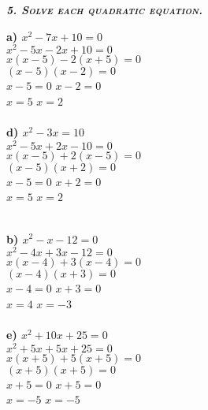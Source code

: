 \documentclass{article}
\begin{document}
\textbf{\emph{\textsc{5. Solve each quadratic equation.}}}
\begin{multicols}{3}
    \textbf{a) $x^2-7x+10=0$} \\
    $x^2-5x-2x+10=0$ \\
    $x(x-5)-2(x+5)=0$ \\
    $(x-5)(x-2)=0$ \\
    $x-5=0$ \hspace{0.45cm} $x-2=0$ \\
    $x=5$ \hspace{1cm} $x=2$ \\ \\
    \textbf{d) $x^2-3x=10$} \\
    $x^2-5x+2x-10=0$ \\
    $x(x-5)+2(x-5)=0$ \\
    $(x-5)(x+2)=0$ \\
    $x-5=0$ \hspace{0.45cm}  $x+2=0$ \\
    $x=5$ \hspace{1cm} $x=2$ \\ \\   
    \columnbreak
    
    \textbf{b) $x^2-x-12=0$} \\
    $x^2-4x+3x-12=0$ \\
    $x(x-4)+3(x-4)=0$ \\
    $(x-4)(x+3)=0$ \\
    $x-4=0$ \hspace{0.45cm} $x+3=0$ \\
    $x=4$ \hspace{1cm} $x=-3$ \\ \\
    \textbf{e) $x^2+10x+25=0$} \\ 
    $x^2+5x+5x+25=0$ \\
    $x(x+5)+5(x+5)=0$ \\
    $(x+5)(x+5)=0$ \\
    $x+5=0$ \hspace{0.45cm} $x+5=0$ \\
    $x=-5$ \hspace{1cm} $x=-5$ \\ \\
    \columnbreak
    

\end{multicols}
\end{document}
